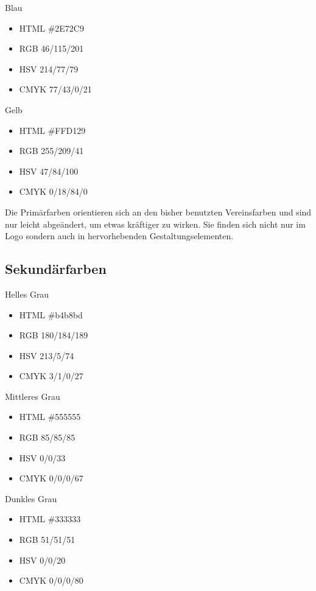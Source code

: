 \documentclass{article}
\begin{document}
\begin{samepage}
\cfield[LESBlue]
Blau
\begin{itemize}
\item HTML \#2E72C9
\item RGB 46/115/201
\item HSV 214/77/79
\item CMYK 77/43/0/21
\end{itemize}
\end{samepage}

\begin{samepage}
\cfield[LESYellow]
Gelb
\begin{itemize}
\item HTML \#FFD129
\item RGB 255/209/41
\item HSV 47/84/100
\item CMYK 0/18/84/0
\end{itemize}
\end{samepage}

Die Primärfarben orientieren sich an den bisher benutzten Vereinsfarben und sind nur leicht abgeändert, um etwas kräftiger zu wirken. Sie finden sich nicht nur im Logo sondern auch in hervorhebenden Gestaltungselementen.

\subsection{Sekundärfarben}
\begin{samepage}
\cfield[SECLight]
Helles Grau
\begin{itemize}
\item HTML \#b4b8bd
\item RGB 180/184/189
\item HSV 213/5/74
\item CMYK 3/1/0/27
\end{itemize}
\end{samepage}

\begin{samepage}
\cfield[SECMedium]
Mittleres Grau
\begin{itemize}
\item HTML \#555555
\item RGB 85/85/85
\item HSV 0/0/33
\item CMYK 0/0/0/67
\end{itemize}
\end{samepage}

\begin{samepage}
\cfield[SECDark]
Dunkles Grau
\begin{itemize}
\item HTML \#333333
\item RGB 51/51/51
\item HSV 0/0/20
\item CMYK 0/0/0/80
\end{itemize}
\end{samepage}
\end{document}
